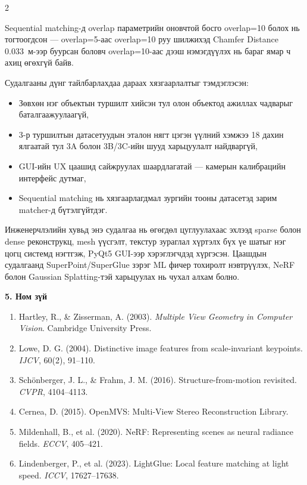 \begin{multicols}{2}

Sequential matching-д overlap параметрийн оновчтой босго overlap=10 болох нь тогтоогдсон --- overlap=5-аас overlap=10 руу шилжихэд Chamfer Distance 0.033~м-ээр буурсан боловч overlap=10-аас дээш нэмэгдүүлэх нь бараг ямар ч ахиц өгөхгүй байв.

Судалгааны дүнг тайлбарлахдаа дараах хязгаарлалтыг тэмдэглэсэн:
\begin{itemize}
    \item Зөвхөн нэг объектын туршилт хийсэн тул олон объектод ажиллах чадварыг баталгаажуулаагүй,
    \item 3-р туршилтын датасетуудын эталон нягт цэгэн үүлний хэмжээ 18 дахин ялгаатай тул 3A болон 3B/3C-ийн шууд харьцуулалт найдваргүй,
    \item GUI-ийн UX цаашид сайжруулах шаардлагатай --- камерын калибрацийн интерфейс дутмаг,
    \item Sequential matching нь хязгаарлагдмал зургийн тооны датасетэд зарим matcher-д бүтэлгүйтдэг.
\end{itemize}

Инженерчлэлийн хувьд энэ судалгаа нь өгөгдөл цуглуулахаас эхлээд sparse болон dense реконструкц, mesh үүсгэлт, текстур зураглал хүртэлх бүх үе шатыг нэг цогц системд нэгтгэж, PyQt5 GUI-ээр хэрэглэгчдэд хүргэсэн. Цаашдын судалгаанд SuperPoint/SuperGlue зэрэг ML фичер тохиролт нэвтрүүлэх, NeRF болон Gaussian Splatting-тэй харьцуулах нь чухал алхам болно.

\noindent\textbf{5. Ном зүй}

\small
\begin{enumerate}
    \item Hartley, R., \& Zisserman, A. (2003). \textit{Multiple View Geometry in Computer Vision}. Cambridge University Press.
    \item Lowe, D. G. (2004). Distinctive image features from scale-invariant keypoints. \textit{IJCV}, 60(2), 91--110.
    \item Sch{\"o}nberger, J. L., \& Frahm, J. M. (2016). Structure-from-motion revisited. \textit{CVPR}, 4104--4113.
    \item Cernea, D. (2015). OpenMVS: Multi-View Stereo Reconstruction Library.
    \item Mildenhall, B., et al. (2020). NeRF: Representing scenes as neural radiance fields. \textit{ECCV}, 405--421.
    \item Lindenberger, P., et al. (2023). LightGlue: Local feature matching at light speed. \textit{ICCV}, 17627--17638.
\end{enumerate}
\normalsize

\end{multicols}

